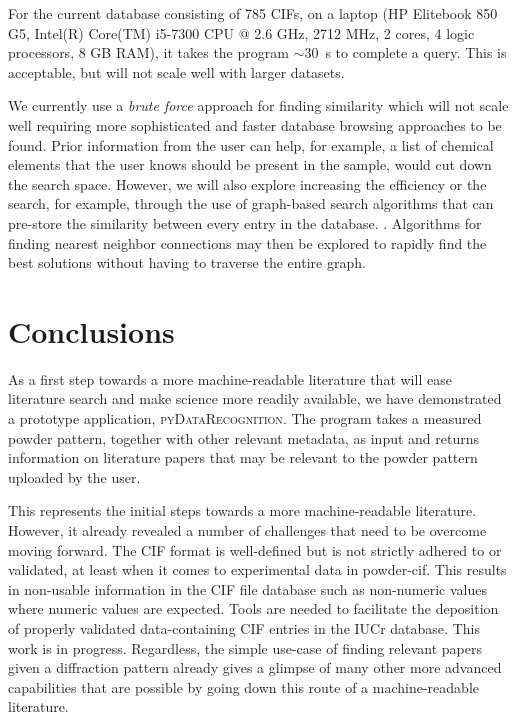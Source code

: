 \documentclass[preprint]{iucr}
\newcommand{\pydr}{\textsc{pyDataRecognition}\xspace}
\begin{document}
For the current database consisting of 785 CIFs, on a laptop (HP Elitebook 850 G5, Intel(R) Core(TM) i5-7300 CPU @ 2.6 GHz, 2712 MHz, 2 cores, 4 logic processors, 8 GB RAM), it takes the program $\sim30$~s to complete a query.  This is acceptable, but will not scale well with larger datasets.

We currently use a  \textit{brute force} approach for finding similarity which will not scale well requiring more sophisticated and faster database browsing approaches to be found.
Prior information from the user can help, for example, a list of chemical elements that the user knows should be present in the sample, would cut down the search space.  However, we will also explore increasing the efficiency or the search, for example, through the
use of graph-based search algorithms that can pre-store the similarity between every entry in the database. \cite{johnsonBillionScaleSimilaritySearch2021}. Algorithms for finding nearest neighbor connections may then be explored to rapidly find the best solutions without having to traverse the entire graph.

\section{Conclusions}

As a first step towards a more machine-readable literature that will ease literature search and make science more readily available, we have demonstrated a prototype application, \pydr. The program takes a measured powder pattern, together with other relevant metadata, as input and returns information on literature papers that may be relevant to the powder pattern uploaded by the user.

This represents the initial steps towards a more machine-readable literature.  However, it already revealed a number of challenges that need to be overcome moving forward. The CIF format is well-defined but is not strictly adhered to or validated, at least when it comes to experimental data in powder-cif.  This results in non-usable information in the CIF file database such as non-numeric values where numeric values are expected. Tools are needed to facilitate the deposition of properly validated data-containing CIF entries in the IUCr database.  This work is in progress. Regardless, the simple use-case of finding relevant papers given a diffraction pattern already gives a glimpse of many other more advanced capabilities that are possible by going down this route of a machine-readable literature.
\end{document}
